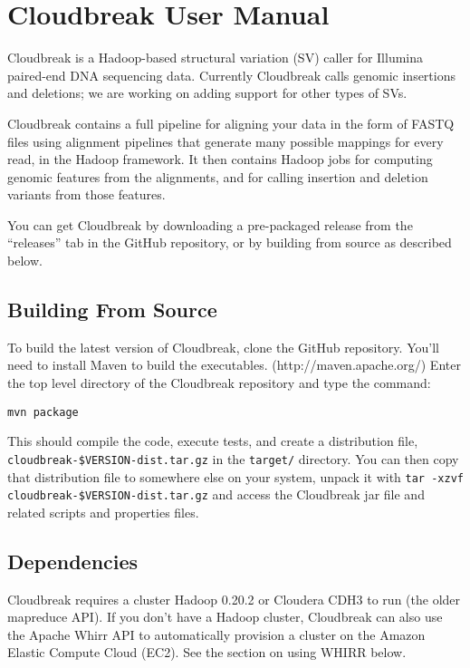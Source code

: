 \documentclass[11pt]{article}
\begin{document}
\printbibliography[title={Supplementary References}]

\newpage

\section{Cloudbreak User Manual}
\label{cloudbreak}

Cloudbreak is a Hadoop-based structural variation (SV) caller for Illumina
paired-end DNA sequencing data. Currently Cloudbreak calls genomic insertions
and deletions; we are working on adding support for other types of SVs.

Cloudbreak contains a full pipeline for aligning your data in the form of FASTQ
files using alignment pipelines that generate many possible mappings for every
read, in the Hadoop framework. It then contains Hadoop jobs for computing
genomic features from the alignments, and for calling insertion and deletion
variants from those features.

You can get Cloudbreak by downloading a pre-packaged release from the ``releases''
tab in the GitHub repository, or by building from source as described below.

\subsection{Building From Source}
\label{buildingfromsource}

To build the latest version of Cloudbreak, clone the GitHub repository. You'll
need to install Maven to build the executables. (http:/\slash maven.apache.org\slash )
Enter the top level directory of the Cloudbreak repository and type the command:

\texttt{mvn package}

This should compile the code, execute tests, and create a distribution file,
 \texttt{cloudbreak-\$VERSION-dist.tar.gz} in the \texttt{target\slash } directory. You can then copy
 that distribution file to somewhere else on your system, unpack it with
 \texttt{tar -xzvf cloudbreak-\$VERSION-dist.tar.gz} and access the Cloudbreak jar file
 and related scripts and properties files.

\subsection{Dependencies}
\label{dependencies}

Cloudbreak requires a cluster Hadoop 0.20.2 or Cloudera CDH3 to run (the older
mapreduce API). If you don't have a Hadoop cluster, Cloudbreak can also use the
Apache Whirr API to automatically provision a cluster on the Amazon Elastic
Compute Cloud (EC2). See the section on using WHIRR below.
\end{document}
